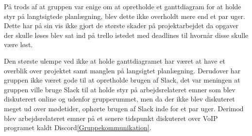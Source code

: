 \vspace{5mm}

 På trods af at gruppen var enige om at opretholde et ganttdiagram for at holde styr på langtsigtede planlægning, blev dette ikke overholdt mere end et par uger. Dette har på sin vis ikke gjort de største skader på projektarbejdet da opgaver der skulle løses blev sat ind på trello istedet med deadlines til hvornår disse skulle være løst.

\vspace{5mm}

 Den største ulempe ved ikke at holde ganttdiagramet har været at have et overblik over projektet samt manglen på langsigtet planlægning. Derudover har gruppen ikke været gode til at opretholde brugen af Slack, det var meningen at gruppen ville bruge Slack til at holde styr på arbejdsrelateret emner som blev diskuterert online og udenfor grupperummet, men da der ikke blev diskuteret meget ud over mødetider, ophørte brugen af Slack inde for et par uger. Derimod blev arbejdsrelateret emner på et senere tidspunkt diskuteret over VoIP programet kaldt Discord\ref{Gruppekommunikation}.